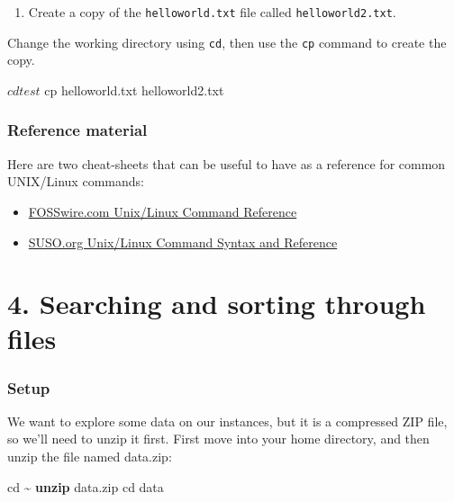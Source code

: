 \documentclass[
]{book}
\newenvironment{Shaded}{\begin{snugshade}}{\end{snugshade}}
\newcommand{\BuiltInTok}[1]{#1}
\newcommand{\ExtensionTok}[1]{#1}
\newcommand{\FunctionTok}[1]{\textcolor[rgb]{0.13,0.29,0.53}{\textbf{#1}}}
\newcommand{\NormalTok}[1]{#1}
\providecommand{\tightlist}{%
  \setlength{\itemsep}{0pt}\setlength{\parskip}{0pt}}
\begin{document}
\begin{enumerate}
\def\labelenumi{\arabic{enumi}.}
\setcounter{enumi}{2}
\tightlist
\item
  Create a copy of the \texttt{helloworld.txt} file called \texttt{helloworld2.txt}.
\end{enumerate}

Change the working directory using \texttt{cd}, then use the \texttt{cp} command to create the copy.

\begin{Shaded}
\begin{Highlighting}[]
\ExtensionTok{$}\NormalTok{ cd test}
\ExtensionTok{$}\NormalTok{ cp helloworld.txt helloworld2.txt}
\end{Highlighting}
\end{Shaded}

\subsection{Reference material}\label{reference-material}

Here are two cheat-sheets that can be useful to have as a reference for common UNIX/Linux commands:

\begin{itemize}
\tightlist
\item
  \href{https://files.fosswire.com/2007/08/fwunixref.pdf}{FOSSwire.com Unix/Linux Command Reference}
\item
  \href{https://i.redd.it/6s2q64ticje51.png}{SUSO.org Unix/Linux Command Syntax and Reference}
\end{itemize}

\chapter{4. Searching and sorting through files}\label{searching-and-sorting-through-files}

\subsection{Setup}\label{setup}

We want to explore some data on our instances, but it is a compressed ZIP file, so we'll need to unzip it first. First move into your home directory, and then unzip the file named data.zip:

\begin{Shaded}
\begin{Highlighting}[]
\BuiltInTok{cd}\NormalTok{ \textasciitilde{}}
\FunctionTok{unzip}\NormalTok{ data.zip}
\BuiltInTok{cd}\NormalTok{ data}
\end{Highlighting}
\end{Shaded}
\end{document}

